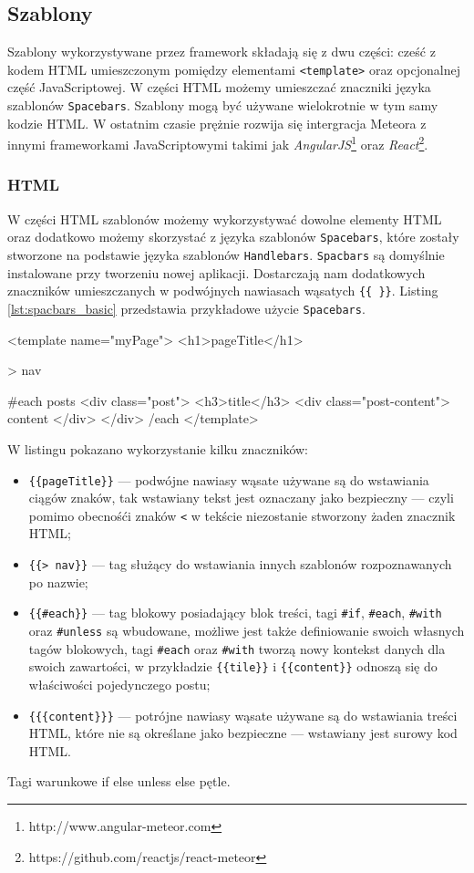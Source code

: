   \subsection{Szablony}
Szablony wykorzystywane przez framework składają się z dwu części: cześć z kodem HTML umieszczonym pomiędzy elementami \verb|<template>| oraz opcjonalnej część JavaScriptowej. W części HTML możemy umieszczać znaczniki języka szablonów \verb|Spacebars|. Szablony mogą być używane wielokrotnie w tym samy kodzie HTML. W ostatnim czasie prężnie rozwija się intergracja Meteora z innymi frameworkami JavaScriptowymi takimi jak \emph{AngularJS}\footnote{http://www.angular-meteor.com} oraz \emph{React}\footnote{https://github.com/reactjs/react-meteor}. 
    \subsubsection{HTML}
W części HTML szablonów możemy wykorzystywać dowolne elementy HTML oraz dodatkowo możemy skorzystać z języka szablonów \verb|Spacebars|, które zostały stworzone na podstawie języka szablonów \verb|Handlebars|. \verb|Spacbars| są domyślnie instalowane przy tworzeniu nowej aplikacji. Dostarczają nam dodatkowych znaczników umieszczanych w podwójnych nawiasach wąsatych \verb|{{ }}|. Listing \ref{lst:spacbars_basic} przedstawia przykładowe użycie \verb|Spacebars|.
\begin{js}[caption={{\textit{Spacebars}}},label={lst:spacbars_basic}]
<template name="myPage">
  <h1>{{pageTitle}}</h1>

  {{> nav}}

  {{#each posts}}
    <div class="post">
      <h3>{{title}}</h3>
      <div class="post-content">
        {{{content}}}
      </div>
    </div>
  {{/each}}
</template>
\end{js}
W listingu pokazano wykorzystanie kilku znaczników:
\begin{itemize}
 \item \verb|{{pageTitle}}| --- podwójne nawiasy wąsate używane są do wstawiania ciągów znaków, tak wstawiany tekst jest oznaczany jako bezpieczny --- czyli pomimo obecnośći znaków \verb|<| w tekście niezostanie stworzony żaden znacznik HTML;
 \item \verb|{{> nav}}| --- tag służący do wstawiania innych szablonów rozpoznawanych po nazwie;
 \item \verb|{{#each}}| --- tag blokowy posiadający blok treści, tagi \verb|#if|, \verb|#each|, \verb|#with| oraz \verb|#unless| są wbudowane, możliwe jest także definiowanie swoich własnych tagów blokowych, tagi \verb|#each| oraz \verb|#with| tworzą nowy kontekst danych dla swoich zawartości, w przykładzie \verb|{{tile}}| i \verb|{{content}}| odnoszą się do właściwości pojedynczego postu;
 \item \verb|{{{content}}}| --- potrójne nawiasy wąsate używane są do wstawiania treści HTML, które nie są określane jako bezpieczne --- wstawiany jest surowy kod HTML. 
\end{itemize}
Tagi warunkowe if else unless else pętle.


